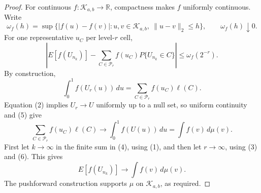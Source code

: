 \documentclass{article}
\begin{document}
\begin{proof}
For continuous \(f:\mathcal K_{a,b}\to\mathbb R\), compactness makes \(f\) uniformly continuous. Write
\[
 \omega_f(h)=\sup\{|f(u)-f(v)|:u,v\in\mathcal K_{a,b},\
 \|u-v\|_2\le h\},\qquad \omega_f(h)\downarrow0.
\tag{3}
\]
For one representative \(u_C\) per level-\(r\) cell,
\[
 \left|E[f(U_{n_k})]-\sum_{C\in\mathcal P_r}
 f(u_C)P\{U_{n_k}\in C\}\right|\le\omega_f(2^{-r}).
\tag{4}
\]
By construction,
\[
 \int_0^1 f(U_r(u))\,du=\sum_{C\in\mathcal P_r}f(u_C)\ell(C).
\tag{5}
\]
Equation (2) implies \(U_r\to U\) uniformly up to a null set, so uniform continuity and (5) give
\[
 \sum_{C\in\mathcal P_r}f(u_C)\ell(C)
 \longrightarrow\int_0^1f(U(u))\,du=\int f(v)\,d\mu(v).
\tag{6}
\]
First let \(k\to\infty\) in the finite sum in (4), using (1), and then let \(r\to\infty\), using (3) and (6). This gives
\[
 E[f(U_{n_k})]\longrightarrow\int f(v)\,d\mu(v).
\]
The pushforward construction supports \(\mu\) on \(\mathcal K_{a,b}\), as required.
\end{proof}
\end{document}
